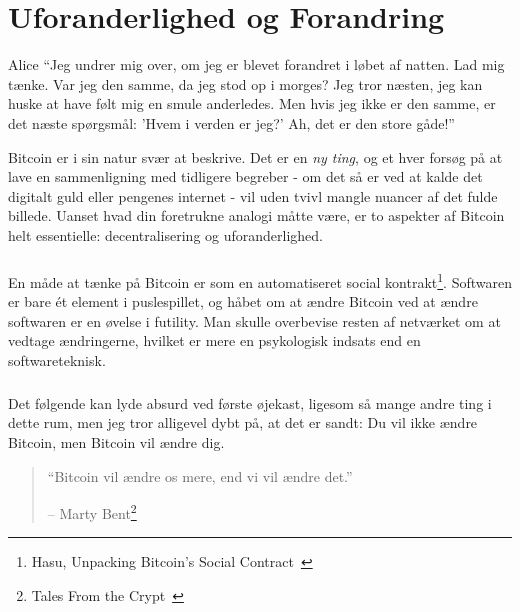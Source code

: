 \chapter{Uforanderlighed og Forandring}
\label{les:1}

\begin{chapquote}{Alice}
\enquote{Jeg undrer mig over, om jeg er blevet forandret i løbet af natten. Lad 
mig tænke. Var jeg den samme, da jeg stod op i morges? Jeg tror næsten, jeg kan 
huske at have følt mig en smule anderledes. Men hvis jeg ikke er den samme, er 
det næste spørgsmål: 'Hvem i verden er jeg?' Ah, det er den store gåde!}
\end{chapquote}

Bitcoin er i sin natur svær at beskrive. Det er en \textit{ny ting}, og et hver
forsøg på at lave en sammenligning med tidligere begreber - om det så er ved at 
kalde det digitalt guld eller pengenes internet - vil uden tvivl mangle nuancer 
af det fulde billede. Uanset hvad din foretrukne analogi måtte være, er to 
aspekter af Bitcoin helt essentielle: decentralisering og uforanderlighed.

\paragraph{}
En måde at tænke på Bitcoin er som en automatiseret social kontrakt\footnote{Hasu,
Unpacking Bitcoin's Social Contract~\cite{social-contract}}. Softwaren er
bare ét element i puslespillet, og håbet om at ændre Bitcoin ved at ændre
softwaren er en øvelse i futility. Man skulle overbevise resten af
netværket om at vedtage ændringerne, hvilket er mere en psykologisk indsats end en
softwareteknisk.

\paragraph{}
Det følgende kan lyde absurd ved første øjekast, ligesom så mange andre ting i
dette rum, men jeg tror alligevel dybt på, at det er sandt: Du
vil ikke ændre Bitcoin, men Bitcoin vil ændre dig.

\begin{quotation}\begin{samepage}
\enquote{Bitcoin vil ændre os mere, end vi vil ændre det.}
\begin{flushright} -- Marty Bent\footnote{Tales From the Crypt~\cite{tftc21}}
\end{flushright}\end{samepage}\end{quotation}

